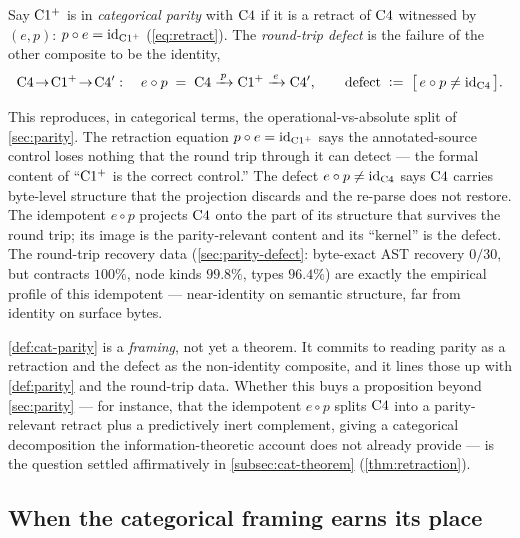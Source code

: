 \begin{definition}
\label{def:cat-parity}
Say $\mathrm{C1^{+}}$ is in \emph{categorical parity} with $\mathrm{C}4$ if it is a
retract of $\mathrm{C}4$ witnessed by $(e,p)$: $p\circ e=\mathrm{id}_{\mathrm{C1^{+}}}$
(\cref{eq:retract}). The \emph{round-trip defect} is the failure of the other
composite to be the identity,
\[
  \mathrm{C}4 \!\to\! \mathrm{C1^{+}} \!\to\! \mathrm{C}4':\quad
  e\circ p \;=\; \mathrm{C}4\xrightarrow{\,p\,}\mathrm{C1^{+}}\xrightarrow{\,e\,}\mathrm{C}4',
  \qquad
  \text{defect} \;\vcentcolon=\; \big[\,e\circ p \ne \mathrm{id}_{\mathrm{C}4}\,\big].
\]
\end{definition}

This reproduces, in categorical terms, the operational-vs-absolute split of
\cref{sec:parity}. The retraction equation $p\circ e=\mathrm{id}_{\mathrm{C1^{+}}}$
says the annotated-source control loses nothing that the round trip through it
can detect --- the formal content of ``$\mathrm{C1^{+}}$ is the correct control.''
The defect $e\circ p\ne\mathrm{id}_{\mathrm{C}4}$ says $\mathrm{C}4$ carries
byte-level structure that the projection discards and the re-parse does not
restore. The idempotent $e\circ p$ projects $\mathrm{C}4$ onto the part of its
structure that survives the round trip; its image is the parity-relevant
content and its ``kernel'' is the defect. The round-trip recovery data
(\cref{sec:parity-defect}: byte-exact AST recovery $0/30$, but contracts
$100\%$, node kinds $99.8\%$, types $96.4\%$) are exactly the empirical
profile of this idempotent --- near-identity on semantic structure, far from
identity on surface bytes.

\begin{remark}
\label{rem:cat-claim}
\cref{def:cat-parity} is a \emph{framing}, not yet a theorem. It commits to
reading parity as a retraction and the defect as the non-identity composite,
and it lines those up with \cref{def:parity} and the round-trip data. Whether this
buys a proposition beyond \cref{sec:parity} --- for instance, that the
idempotent $e\circ p$ splits $\mathrm{C}4$ into a parity-relevant retract plus a
predictively inert complement, giving a categorical decomposition the
information-theoretic account does not already provide --- is the question
settled affirmatively in \cref{subsec:cat-theorem} (\cref{thm:retraction}).
\end{remark}

\subsection{When the categorical framing earns its place}
\label{subsec:cat-gonogo}

